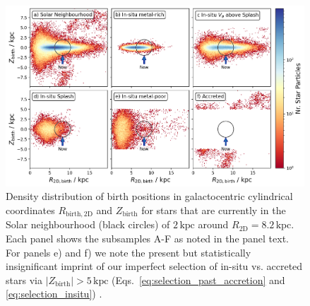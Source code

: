 \documentclass[fleqn,usenatbib]{mnras}
\begin{document}
\begin{figure}
    \centering
    \includegraphics[width=0.997\textwidth]{figures/splash_rbirth_zbirth}
    \caption{Density distribution of birth positions in galactocentric cylindrical coordinates $R_\mathrm{birth, 2D}$ and $Z_\mathrm{birth}$ for stars that are currently in the Solar neighbourhood (black circles) of $2\,\mathrm{kpc}$ around $R_\mathrm{2D} = 8.2\,\mathrm{kpc}$. Each panel shows the subsamples A-F as noted in the panel text. For panels e) and f) we note the present but statistically insignificant imprint of our imperfect selection of in-situ vs. accreted stars via $\vert Z_\mathrm{birth} \vert > 5\,\mathrm{kpc}$ (Eqs.~\ref{eq:selection_past_accretion} and \ref{eq:selection_insitu}) \href{https://github.com/svenbuder/gse_nihaouhd/tree/main/figures}{\faGithub}.}
    \label{fig:splash_rbirth_zbirth}
\end{figure}
\end{document}
